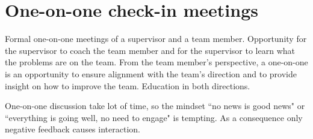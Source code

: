 \section{One-on-one check-in meetings}


Formal one-on-one meetings of a supervisor and a team member. Opportunity for the supervisor to coach the team member and for the supervisor to learn what the problems are on the team. From the team member's perspective, a one-on-one is an opportunity to ensure alignment with the team's direction and to provide insight on how to improve the team. Education in both directions. 

One-on-one discussion take lot of time, so the mindset ``no news is good news" or ``everything is going well, no need to engage" is tempting. As a consequence only negative feedback causes interaction. 


